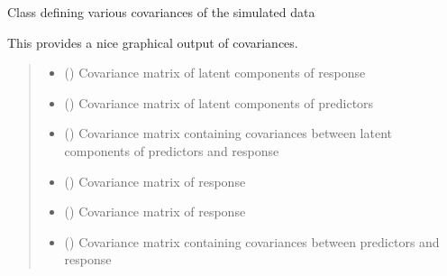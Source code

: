 \documentclass[letterpaper,10pt,english]{sphinxmanual}
\begin{document}
\begin{fulllineitems}
\label{\detokenize{Classes:pysimrel.Covariances}}
\pysigstartsignatures
{}
\pysigstopsignatures
\sphinxAtStartPar
Class defining various covariances of the simulated data

\sphinxAtStartPar
This provides a nice graphical output of covariances.
\begin{quote}\begin{description}
\begin{itemize}
\item {} 
\sphinxAtStartPar
{} () \textendash{} Covariance matrix of latent components of response

\item {} 
\sphinxAtStartPar
{} () \textendash{} Covariance matrix of latent components of predictors

\item {} 
\sphinxAtStartPar
{} () \textendash{} Covariance matrix containing covariances between latent components of predictors and response

\item {} 
\sphinxAtStartPar
{} () \textendash{} Covariance matrix of response

\item {} 
\sphinxAtStartPar
{} () \textendash{} Covariance matrix of response

\item {} 
\sphinxAtStartPar
{} () \textendash{} Covariance matrix containing covariances between predictors and response

\end{itemize}

\end{description}\end{quote}

\end{fulllineitems}
\end{document}
